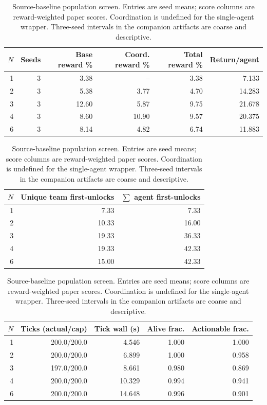 \begin{table}[t]
\centering
\small
\setlength{\tabcolsep}{5pt}
\begin{tabular}{r r r r r r}
\hline
$N$ & Seeds & Base reward \% & Coord. reward \% & Total reward \% & Return/agent \\
\hline
1 & 3 & 3.38 & -- & 3.38 & 7.133 \\
2 & 3 & 5.38 & 3.77 & 4.70 & 14.283 \\
3 & 3 & 12.60 & 5.87 & 9.75 & 21.678 \\
4 & 3 & 8.60 & 10.90 & 9.57 & 20.375 \\
6 & 3 & 8.14 & 4.82 & 6.74 & 11.883 \\
\hline
\end{tabular}
\par\smallskip
\begin{tabular}{r r r}
\hline
$N$ & Unique team first-unlocks & $\sum$ agent first-unlocks \\
\hline
1 & 7.33 & 7.33 \\
2 & 10.33 & 16.00 \\
3 & 19.33 & 36.33 \\
4 & 19.33 & 42.33 \\
6 & 15.00 & 42.33 \\
\hline
\end{tabular}
\par\smallskip
\begin{tabular}{r r r r r}
\hline
$N$ & Ticks (actual/cap) & Tick wall (s) & Alive frac. & Actionable frac. \\
\hline
1 & 200.0/200.0 & 4.546 & 1.000 & 1.000 \\
2 & 200.0/200.0 & 6.899 & 1.000 & 0.958 \\
3 & 197.0/200.0 & 8.661 & 0.980 & 0.869 \\
4 & 200.0/200.0 & 10.329 & 0.994 & 0.941 \\
6 & 200.0/200.0 & 14.648 & 0.996 & 0.901 \\
\hline
\end{tabular}
\caption{Source-baseline population screen. Entries are seed means; score columns are reward-weighted paper scores. Coordination is undefined for the single-agent wrapper. Three-seed intervals in the companion artifacts are coarse and descriptive.}
\label{tab:e1-source-scaling}
\end{table}
